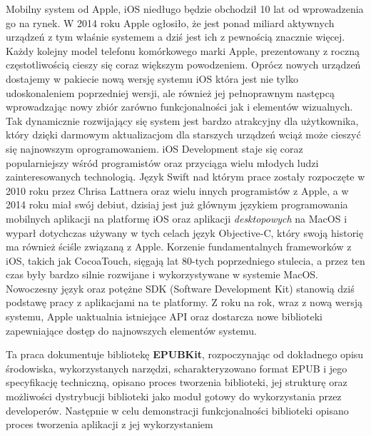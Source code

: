 Mobilny system od Apple, iOS niedługo będzie obchodził 10 lat od wprowadzenia go na rynek. W 2014 roku Apple ogłosiło, że jest ponad miliard aktywnych urządzeń z tym właśnie systemem a dziś jest ich z pewnością znacznie więcej. Każdy kolejny model telefonu komórkowego marki Apple, prezentowany z roczną częstotliwością cieszy się coraz większym powodzeniem. Oprócz nowych urządzeń dostajemy w pakiecie nową wersję systemu iOS która jest nie tylko udoskonaleniem poprzedniej wersji, ale również jej pełnoprawnym następcą wprowadzając nowy zbiór zarówno funkcjonalności jak i elementów wizualnych. Tak dynamicznie rozwijający się system jest bardzo atrakcyjny dla użytkownika, który dzięki darmowym aktualizacjom dla starszych urządzeń wciąż może cieszyć się najnowszym oprogramowaniem. iOS Development staje się coraz popularniejszy wśród programistów oraz przyciąga wielu młodych ludzi zainteresowanych technologią. Język Swift nad którym prace zostały rozpoczęte w 2010 roku przez Chrisa Lattnera oraz wielu innych programistów z Apple, a w 2014 roku miał swój debiut, dzisiaj jest już głównym językiem programowania mobilnych aplikacji na platformę iOS oraz aplikacji \textit{desktopowych} na MacOS i wyparł dotychczas używany w tych celach język Objective-C, który swoją historię ma również ściśle związaną z Apple. Korzenie fundamentalnych frameworków z iOS, takich jak CocoaTouch, sięgają lat 80-tych poprzedniego stulecia, a przez ten czas były bardzo silnie rozwijane i wykorzystywane w systemie MacOS. Nowoczesny język oraz potężne SDK (Software Development Kit) stanowią dziś podstawę pracy z aplikacjami na te platformy. Z roku na rok, wraz z nową wersją systemu, Apple uaktualnia istniejące API oraz dostarcza nowe biblioteki zapewniające dostęp do najnowszych elementów systemu.

Ta praca dokumentuje bibliotekę \textbf{EPUBKit}, rozpoczynając od dokładnego opisu środowiska, wykorzystanych narzędzi, scharakteryzowano format EPUB i jego specyfikację techniczną, opisano proces tworzenia biblioteki, jej strukturę oraz możliwości dystrybucji biblioteki jako moduł gotowy do wykorzystania przez developerów. Następnie w celu demonstracji funkcjonalności biblioteki opisano proces tworzenia aplikacji z jej wykorzystaniem
